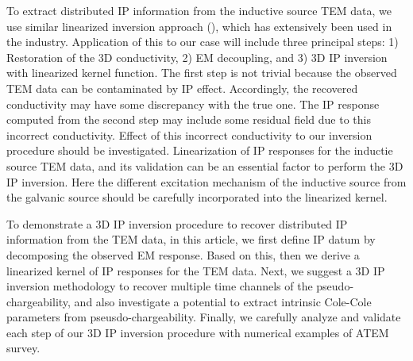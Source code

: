 \documentclass[a4paper, 11pt]{article}
\begin{document}
To extract distributed IP information from the inductive source TEM data, we use similar linearized inversion approach (\cite{seigel1959,doug1994}), which has extensively been used in the industry. Application of this to our case will include three principal steps: 1) Restoration of the 3D conductivity, 2) EM decoupling, and 3) 3D IP inversion with linearized kernel function. 
The first step is not trivial because the observed TEM data can be contaminated by IP effect. 
Accordingly, the recovered conductivity may have some discrepancy with the true one.
The IP response computed from the second step may include some residual field due to this incorrect conductivity. 
Effect of this incorrect conductivity to our inversion procedure should be investigated. 
Linearization of IP responses for the inductie source TEM data, and its validation can be an essential factor to perform the 3D IP inversion. 
Here the different excitation mechanism of the inductive source from the galvanic source should be carefully incorporated into the linearized kernel.  

To demonstrate a 3D IP inversion procedure to recover distributed IP information from the TEM data, in this article, we first define IP datum by decomposing the observed EM response. 
Based on this, then we derive a linearized kernel of IP responses for the TEM data. 
Next, we suggest a 3D IP inversion methodology to recover multiple time channels of the pseudo-chargeability, and also investigate a potential to extract intrinsic Cole-Cole parameters from pseusdo-chargeability. Finally, we carefully analyze and validate each step of our 3D IP inversion procedure with numerical examples of ATEM survey.       
    
\end{document}
